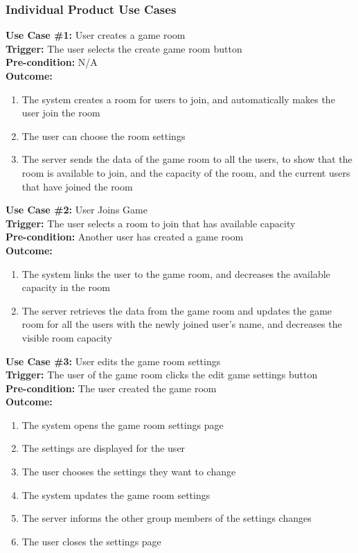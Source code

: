 \documentclass[12pt]{article}
\begin{document}
\newpage
\subsubsection{Individual Product Use Cases}

\textbf{Use Case \#1:} User creates a game room\\
\textbf{Trigger:} The user selects the create game room button\\
\textbf{Pre-condition:} N/A\\
\textbf{Outcome:}
\begin{enumerate}
	\item The system creates a room for users to join, and automatically makes the user join the room
    \item The user can choose the room settings
	\item The server sends the data of the game room to all the users, to show that the room is available to join, and the capacity of the room, and the current users that have joined the room
\end{enumerate}
\textbf{Use Case \#2:} User Joins Game\\
\textbf{Trigger:} The user selects a room to join that has available capacity\\
\textbf{Pre-condition:} Another user has created a game room\\
\textbf{Outcome:}
\begin{enumerate}
	\item The system links the user to the game room, and decreases the available capacity in the room
    \item The server retrieves the data from the game room and updates the game room for all the users with the newly joined user's name, and decreases the visible room capacity
\end{enumerate}
\textbf{Use Case \#3:} User edits the game room settings\\
\textbf{Trigger:} The user of the game room clicks the edit game settings button\\
\textbf{Pre-condition:} The user created the game room\\
\textbf{Outcome:}
\begin{enumerate}
	\item The system opens the game room settings page
    \item The settings are displayed for the user
    \item The user chooses the settings they want to change
    \item The system updates the game room settings
    \item The server informs the other group members of the settings changes
    \item The user closes the settings page
\end{enumerate}
\end{document}
